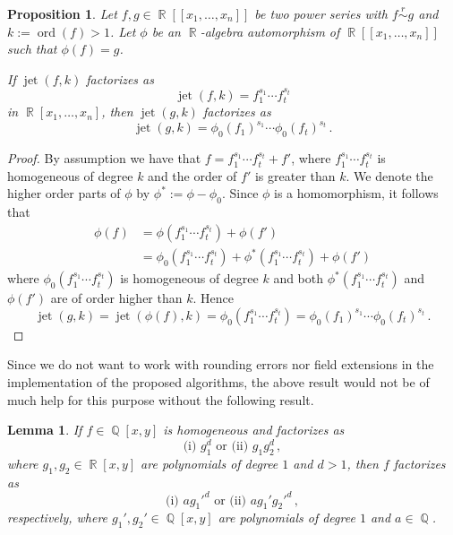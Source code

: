 \documentclass[noend]{amsproc}
\newtheorem{prop}[theorem]{Proposition}
\newtheorem{lemma}[theorem]{Lemma}
\theoremstyle{definition}
\newcommand{\requiv}{\ensuremath{\mathrel{\overset{r}{\sim}}}}
\DeclareMathOperator{\ord}{ord}
\DeclareMathOperator{\jet}{jet}
\DeclareMathOperator{\Q}{\mathbb{Q}}
\DeclareMathOperator{\R}{\mathbb{R}}
\begin{document}
\begin{prop}\label{kjet}
Let $f,g \in \R[[x_1,\ldots,x_n]]$ be two power series with $f \requiv g$ and
$k := \ord(f) > 1$. Let $\phi$ be an $\R$-algebra automorphism of
$\R[[x_1,\ldots,x_n]]$ such that $\phi(f)=g$.

If $\jet(f,k)$ factorizes as
\[
\jet(f,k) = f_1^{s_1} \cdots f_t^{s_t}
\]
in $\R[x_1,\ldots,x_n]$, then $\jet(g,k)$ factorizes as
\[
\jet(g,k) = \phi_0(f_1)^{s_1} \cdots \phi_0(f_t)^{s_t} \,.
\]
\end{prop}

\begin{proof}
By assumption we have that $f = f_1^{s_1} \cdots f_t^{s_t} + f'$, where
$f_1^{s_1} \cdots f_t^{s_t}$ is homogeneous of degree $k$ and the order of $f'$
is greater than $k$. We denote the higher order parts of $\phi$ by
$\phi^* := \phi-\phi_0$. Since $\phi$ is a homomorphism, it follows that
\begin{align*}
\phi(f) &= \phi(f_1^{s_1} \cdots f_t^{s_t}) + \phi(f') \\
&= \phi_0(f_1^{s_1} \cdots f_t^{s_t})
+ \phi^*(f_1^{s_1} \cdots f_t^{s_t}) + \phi(f')
\end{align*}
where $\phi_0(f_1^{s_1} \cdots f_t^{s_t})$ is homogeneous of degree $k$ and
both $\phi^*(f_1^{s_1} \cdots f_t^{s_t})$ and $\phi(f')$ are of order higher
than $k$. Hence
\[
\jet(g, k) = \jet(\phi(f), k) = \phi_0(f_1^{s_1} \cdots f_t^{s_t})
= \phi_0(f_1)^{s_1} \cdots \phi_0(f_t)^{s_t} \,.
\]
\end{proof}

Since we do not want to work with rounding errors nor field extensions in the
implementation of the proposed algorithms, the above result would not be of
much help for this purpose without the following result.

\begin{lemma}\label{x^3}
If $f \in \Q[x,y]$ is homogeneous and factorizes as
\[
\text{(i) } g_1^d \text{ or (ii) } g_1 g_2^d \,,
\]
where $g_1, g_2 \in \R[x,y]$ are polynomials of degree $1$ and $d > 1$, then
$f$ factorizes as
\[
\text{(i) } ag_1'^d \text{ or (ii) } ag_1' g_2'^d \,,
\]
respectively, where $g_1', g_2' \in \Q[x,y]$ are polynomials of degree $1$ and
$a \in \Q$.
\end{lemma}
\end{document}
